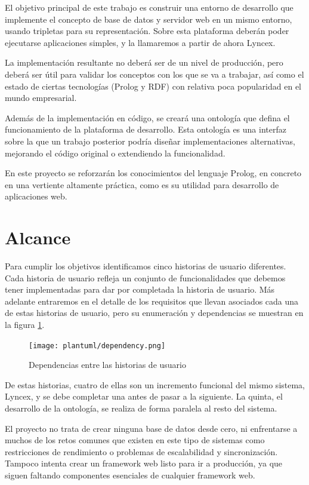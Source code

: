 \documentclass[openright,twoside,12pt]{book}
\begin{document}
El objetivo principal de este trabajo es construir una entorno de desarrollo que implemente el concepto de base de datos y servidor web en un mismo entorno, usando tripletas para su representación. Sobre esta plataforma deberán poder ejecutarse aplicaciones simples, y la llamaremos a partir de ahora Lyncex.

La implementación resultante no deberá ser de un nivel de producción, pero deberá ser útil para validar los conceptos con los que se va a trabajar, así como el estado de ciertas tecnologías (Prolog y RDF) con relativa poca popularidad en el mundo empresarial.\cite{stackoverflowsurvey}

Además de la implementación en código, se creará una ontología que defina el funcionamiento de la plataforma de desarrollo. Esta ontología es una interfaz sobre la que un trabajo posterior podría diseñar implementaciones alternativas, mejorando el código original o extendiendo la funcionalidad.

En este proyecto se reforzarán los conocimientos del lenguaje Prolog, en concreto en una vertiente altamente práctica, como es su utilidad para desarrollo de aplicaciones web.

\section{Alcance}

Para cumplir los objetivos identificamos cinco historias de usuario diferentes. Cada historia de usuario refleja un conjunto de funcionalidades que debemos tener implementadas para dar por completada la historia de usuario. Más adelante entraremos en el detalle de los requisitos que llevan asociados cada una de estas historias de usuario, pero su enumeración y dependencias se muestran en la figura \ref{fig:dependencia}.

\begin{figure}[h]
    \centering
    \texttt{[image: plantuml/dependency.png]}
    \caption{Dependencias entre las historias de usuario}
    \label{fig:dependencia}
\end{figure}

De estas historias, cuatro de ellas son un incremento funcional del mismo sistema, Lyncex, y se debe completar una antes de pasar a la siguiente. La quinta, el desarrollo de la ontología, se realiza de forma paralela al resto del sistema.

El proyecto no trata de crear ninguna base de datos desde cero, ni enfrentarse a muchos de los retos comunes que existen en este tipo de sistemas como restricciones de rendimiento o problemas de escalabilidad y sincronización. Tampoco intenta crear un framework web listo para ir a producción, ya que siguen faltando componentes esenciales de cualquier framework web.
\end{document}
